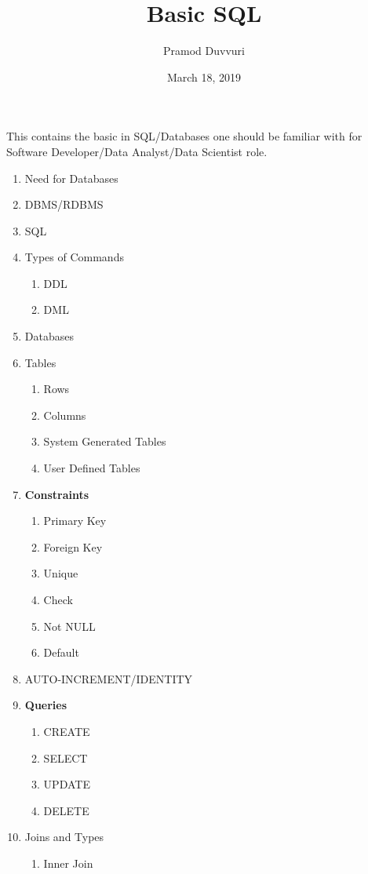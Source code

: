 \documentclass[11pt]{article}
\title{Basic SQL}
\author{Pramod Duvvuri}
\date{March 18, 2019}
\begin{document}
	\maketitle
	This contains the basic in SQL/Databases one should be familiar with for Software Developer/Data Analyst/Data Scientist role. 
	\begin{enumerate}
	\item Need for Databases
	\item DBMS/RDBMS
	\item SQL
	\item Types of Commands
	\begin{enumerate}
		\item DDL
		\item DML
	\end{enumerate}	
    \item Databases 
     \item Tables
     \begin{enumerate}
     	\item Rows
     	\item Columns
     	\item System Generated Tables
     	\item User Defined Tables
     \end{enumerate} 
    \item \textbf{Constraints}
    \begin{enumerate}
    	\item Primary Key
    	\item Foreign Key
    	\item Unique
    	\item Check
    	\item Not NULL
    	\item Default
    \end{enumerate}
    \item AUTO-INCREMENT/IDENTITY
    \item \textbf{Queries}
    \begin{enumerate}
    	\item CREATE
    	\item SELECT
    	\item UPDATE
    	\item DELETE
    \end{enumerate}
   \item Joins and Types
   \begin{enumerate}
   	\item Inner Join

\end{enumerate}
\end{enumerate}
\end{document}
